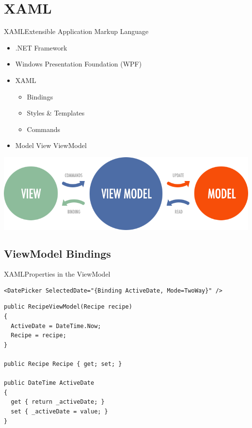 \section{XAML} 
\begin{frame}[fragile]{XAML}{Extensible Application Markup Language}
  \begin{itemize}
    \item .NET Framework
    \item Windows Presentation Foundation (WPF)
    \item XAML
    \begin{itemize}
      \item Bindings
      \item Styles \& Templates
      \item Commands
    \end{itemize}
    \item Model View ViewModel
  \end{itemize}


  \includegraphics[width=\textwidth]{slides/mvvm.png}

\end{frame}


\subsection{ViewModel Bindings} 
\begin{frame}[fragile]{XAML}{Properties in the ViewModel}

\begin{lstlisting}
<DatePicker SelectedDate="{Binding ActiveDate, Mode=TwoWay}" />
\end{lstlisting}

\begin{lstlisting}
public RecipeViewModel(Recipe recipe)
{
  ActiveDate = DateTime.Now;
  Recipe = recipe;
}

public Recipe Recipe { get; set; }

public DateTime ActiveDate
{
  get { return _activeDate; }
  set { _activeDate = value; }
}
\end{lstlisting}

\end{frame}

